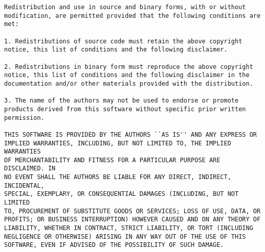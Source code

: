 \documentclass[11pt]{book}
\begin{document}
\begin{verbatim}
Redistribution and use in source and binary forms, with or without
modification, are permitted provided that the following conditions are met:

1. Redistributions of source code must retain the above copyright
notice, this list of conditions and the following disclaimer.

2. Redistributions in binary form must reproduce the above copyright
notice, this list of conditions and the following disclaimer in the
documentation and/or other materials provided with the distribution.

3. The name of the authors may not be used to endorse or promote
products derived from this software without specific prior written
permission.

THIS SOFTWARE IS PROVIDED BY THE AUTHORS ``AS IS'' AND ANY EXPRESS OR
IMPLIED WARRANTIES, INCLUDING, BUT NOT LIMITED TO, THE IMPLIED WARRANTIES
OF MERCHANTABILITY AND FITNESS FOR A PARTICULAR PURPOSE ARE DISCLAIMED. IN
NO EVENT SHALL THE AUTHORS BE LIABLE FOR ANY DIRECT, INDIRECT, INCIDENTAL,
SPECIAL, EXEMPLARY, OR CONSEQUENTIAL DAMAGES (INCLUDING, BUT NOT LIMITED
TO, PROCUREMENT OF SUBSTITUTE GOODS OR SERVICES; LOSS OF USE, DATA, OR
PROFITS; OR BUSINESS INTERRUPTION) HOWEVER CAUSED AND ON ANY THEORY OF
LIABILITY, WHETHER IN CONTRACT, STRICT LIABILITY, OR TORT (INCLUDING
NEGLIGENCE OR OTHERWISE) ARISING IN ANY WAY OUT OF THE USE OF THIS
SOFTWARE, EVEN IF ADVISED OF THE POSSIBILITY OF SUCH DAMAGE.
\end{verbatim}
\end{document}
